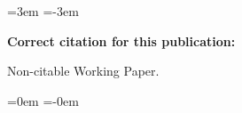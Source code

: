 
\leftskip=3em	%
\parindent=-3em

{\bf Correct citation for this publication:}

Non-citable Working Paper.	%



\leftskip=0em	%
\parindent=-0em







